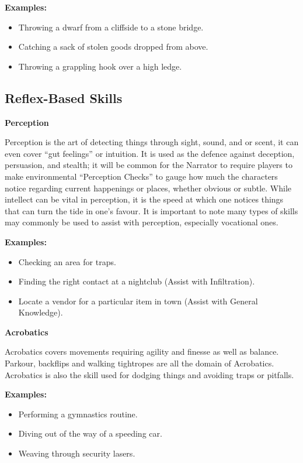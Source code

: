 \begin{displayquote}
    \textbf{Examples:}
    \begin{itemize}
        \item Throwing a dwarf from a cliffside to a stone bridge.
        \item Catching a sack of stolen goods dropped from above.
        \item Throwing a grappling hook over a high ledge.
    \end{itemize}
\end{displayquote}

\subsection{Reflex-Based Skills}

\textbf{Perception}

Perception is the art of detecting things through sight, sound, and or scent, it can even cover “gut feelings” or intuition. It is used as the defence against deception, persuasion, and stealth; it will be common for the Narrator to require players to make environmental “Perception Checks” to gauge how much the characters notice regarding current happenings or places, whether obvious or subtle. While intellect can be vital in perception, it is the speed at which one notices things that can turn the tide in one’s favour. It is important to note many types of skills may commonly be used to assist with perception, especially vocational ones.

\begin{displayquote}
    \textbf{Examples:}
    \begin{itemize}
        \item Checking an area for traps.
        \item Finding the right contact at a nightclub (Assist with Infiltration).
        \item Locate a vendor for a particular item in town (Assist with General Knowledge).
    \end{itemize}
\end{displayquote}

\textbf{Acrobatics}

Acrobatics covers movements requiring agility and finesse as well as balance. Parkour, backflips and walking tightropes are all the domain of Acrobatics. Acrobatics is also the skill used for dodging things and avoiding traps or pitfalls.

\begin{displayquote}
    \textbf{Examples:}
    \begin{itemize}
        \item Performing a gymnastics routine.
        \item Diving out of the way of a speeding car.
        \item Weaving through security lasers.
    \end{itemize}
\end{displayquote}

